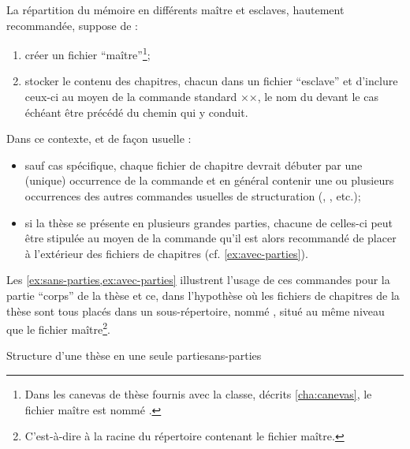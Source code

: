 La répartition du mémoire en différents maître et esclaves, hautement
recommandée, suppose de :
\begin{enumerate}
\item créer un fichier \enquote{maître}\footnote{Dans les canevas de thèse
    fournis avec la classe, décrits \vref{cha:canevas}, le fichier maître est
    nommé \file{\thesismasterfile}.};
\item stocker le contenu des chapitres, chacun dans un fichier
  \enquote{esclave}%
  et d'inclure ceux-ci au moyen de la commande
  standard ××, le nom du  devant le cas échéant être précédé du chemin qui y
  conduit.
\end{enumerate}
%
Dans ce contexte, et de façon usuelle :
\begin{itemize}
\item sauf cas spécifique, chaque fichier de chapitre devrait débuter par une
  (unique) occurrence de la commande  et en général
  contenir une ou plusieurs occurrences des autres commandes usuelles de
  structuration (, , etc.);
\item si la thèse se présente en plusieurs grandes parties, chacune
  de celles-ci peut être stipulée au moyen de la commande
   qu'il est alors recommandé de placer à
  l'extérieur des fichiers de chapitres (cf.
  \vref{ex:avec-parties}).
\end{itemize}
%
Les \vref{ex:sans-parties,ex:avec-parties} illustrent l'usage de ces commandes
pour la partie \enquote{corps} de la thèse et ce, dans l'hypothèse où les
fichiers de chapitres de la thèse sont tous placés dans un sous-répertoire,
nommé , situé au même niveau que le fichier
maître\footnote{C'est-à-dire à la racine du répertoire contenant le fichier
  maître.}.
\begin{dbexample}{Structure d'une thèse en une seule partie}{sans-parties}
\begin{bodycode}
÷}
÷}
...
÷}
÷}
\end{bodycode}
\end{dbexample}
